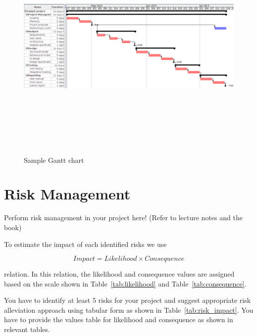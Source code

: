\documentclass[12pt, a4paper]{report}
\begin{document}
\begin{landscape}
\begin{figure}[htb!]
  \begin{center}
    \includegraphics[width=9in, height=4.5in]{../img/sample_gantt.png}
  \end{center}
  \caption{Sample Gantt chart}
  \label{fig:gantt}
\end{figure}
\end{landscape}


\chapter{Risk Management} %
\label{cha:risk_management}
Perform risk management in your project here! (Refer to lecture notes and the book)

To estimate the impact of each identified risks we use

\[
  Impact = Likelihood \times Consequence
 \]

relation. In this relation, the likelihood and consequence values are assigned based on the scale shown in Table~\ref{tab:likelihood} and Table~\ref{tab:consequence}.

You have to identify at least 5 risks for your project and suggest appropriate risk alleviation approach using tabular form as shown in Table~\ref{tab:risk_impact}. You have to provide the values table for likelihood and consequence as shown in relevant tables.
\end{document}
